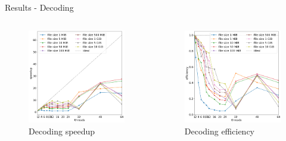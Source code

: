\begin{frame}{Results - Decoding}
    \begin{columns}
            \begin{figure}
                \centering
                \includegraphics[width=\textwidth]{imgs/decode speedup.png}
                \caption{Decoding speedup}
                \label{fig:encoding-speedup}
            \end{figure}
            \begin{figure}
                \centering
                \includegraphics[width=\textwidth]{imgs/decode efficiency.png}
                \caption{Decoding efficiency}
                \label{fig:encoding-efficiency}
            \end{figure}
    \end{columns}
\end{frame}
